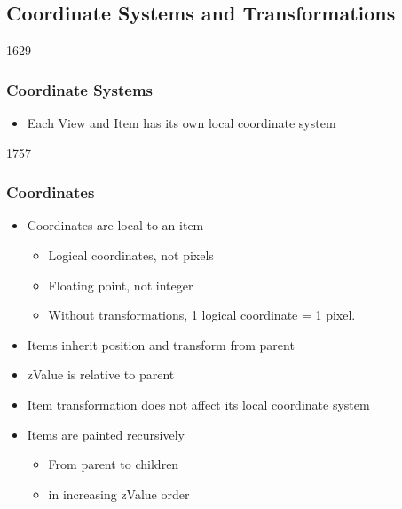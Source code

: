 %
%
%
%


\subsection{Coordinate Systems and Transformations}


\begin{slide}{1629}\frametitle{Coordinate Systems}

\begin{itemize}
\item Each View and Item has its own local coordinate system
\end{itemize}
\end{slide}



\begin{slide}{1757}

\frametitle{Coordinates}
\begin{itemize}
\item Coordinates are local to an item
    \begin{itemize}
    \item Logical coordinates, not pixels
    \item Floating point, not integer
    \item Without transformations, 1 logical coordinate = 1 pixel.
    \end{itemize}   
\item Items inherit position and transform from parent
\item zValue is relative to parent
\item Item transformation does not affect its local coordinate system
\item Items are painted recursively
    \begin{itemize}
    \item From parent to children
    \item in increasing zValue order
    \end{itemize}
\end{itemize}
\end{slide}


